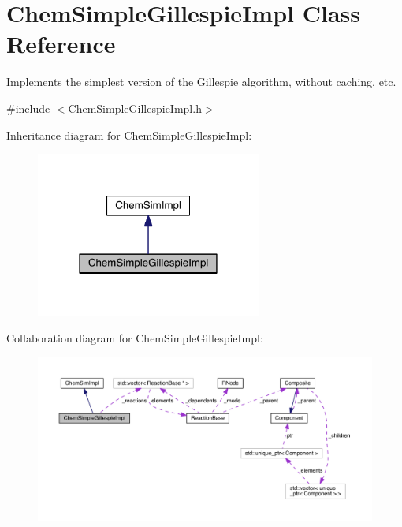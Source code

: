 \hypertarget{classChemSimpleGillespieImpl}{\section{Chem\+Simple\+Gillespie\+Impl Class Reference}
\label{classChemSimpleGillespieImpl}
}


Implements the simplest version of the Gillespie algorithm, without caching, etc.  




{\ttfamily \#include $<$Chem\+Simple\+Gillespie\+Impl.\+h$>$}



Inheritance diagram for Chem\+Simple\+Gillespie\+Impl\+:\nopagebreak
\begin{figure}[H]
\begin{center}
\leavevmode
\includegraphics[width=210pt]{classChemSimpleGillespieImpl__inherit__graph}
\end{center}
\end{figure}


Collaboration diagram for Chem\+Simple\+Gillespie\+Impl\+:\nopagebreak
\begin{figure}[H]
\begin{center}
\leavevmode
\includegraphics[width=350pt]{classChemSimpleGillespieImpl__coll__graph}
\end{center}
\end{figure}
